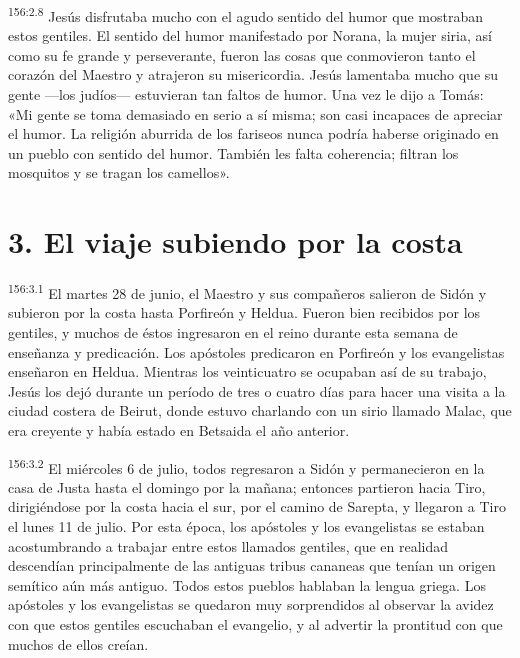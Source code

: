 \par 
\textsuperscript{156:2.8} Jesús disfrutaba mucho con el agudo sentido del humor que mostraban estos gentiles. El sentido del humor manifestado por Norana, la mujer siria, así como su fe grande y perseverante, fueron las cosas que conmovieron tanto el corazón del Maestro y atrajeron su misericordia. Jesús lamentaba mucho que su gente ---los judíos--- estuvieran tan faltos de humor. Una vez le dijo a Tomás: «Mi gente se toma demasiado en serio a sí misma; son casi incapaces de apreciar el humor. La religión aburrida de los fariseos nunca podría haberse originado en un pueblo con sentido del humor. También les falta coherencia; filtran los mosquitos y se tragan los camellos».

\section*{3. El viaje subiendo por la costa}
\par 
\textsuperscript{156:3.1} El martes 28 de junio, el Maestro y sus compañeros salieron de Sidón y subieron por la costa hasta Porfireón y Heldua. Fueron bien recibidos por los gentiles, y muchos de éstos ingresaron en el reino durante esta semana de enseñanza y predicación. Los apóstoles predicaron en Porfireón y los evangelistas enseñaron en Heldua. Mientras los veinticuatro se ocupaban así de su trabajo, Jesús los dejó durante un período de tres o cuatro días para hacer una visita a la ciudad costera de Beirut, donde estuvo charlando con un sirio llamado Malac, que era creyente y había estado en Betsaida el año anterior.

\par 
\textsuperscript{156:3.2} El miércoles 6 de julio, todos regresaron a Sidón y permanecieron en la casa de Justa hasta el domingo por la mañana; entonces partieron hacia Tiro, dirigiéndose por la costa hacia el sur, por el camino de Sarepta, y llegaron a Tiro el lunes 11 de julio. Por esta época, los apóstoles y los evangelistas se estaban acostumbrando a trabajar entre estos llamados gentiles, que en realidad descendían principalmente de las antiguas tribus cananeas que tenían un origen semítico aún más antiguo. Todos estos pueblos hablaban la lengua griega. Los apóstoles y los evangelistas se quedaron muy sorprendidos al observar la avidez con que estos gentiles escuchaban el evangelio, y al advertir la prontitud con que muchos de ellos creían.

